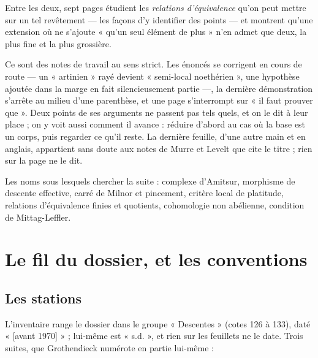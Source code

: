 \documentclass[11pt,a4paper]{article}
\begin{document}
\begin{resume}
Entre les deux, sept pages étudient les \emph{relations d'équivalence} qu'on
peut mettre sur un tel revêtement — les façons d'y identifier des points — et
montrent qu'une extension où ne s'ajoute « qu'un seul élément de plus »
n'en admet que deux, la plus fine et la plus grossière.

Ce sont des notes de travail au sens strict. Les énoncés se corrigent en
cours de route — un « artinien » rayé devient « semi-local noethérien », une
hypothèse ajoutée dans la marge en fait silencieusement partie —, la dernière
démonstration s'arrête au milieu d'une parenthèse, et une page s'interrompt
sur « il faut prouver que ». Deux points de ses arguments ne passent pas tels
quels, et on le dit à leur place ; on y voit aussi comment il avance : réduire
d'abord au cas où la base est un corps, puis regarder ce qu'il reste. La
dernière feuille, d'une autre main et en anglais, appartient sans doute aux
notes de Murre et Levelt que cite le titre ; rien sur la page ne le dit.

Les noms sous lesquels chercher la suite : complexe d'Amitsur, morphisme de
descente effective, carré de Milnor et pincement, critère local de
platitude, relations d'équivalence finies et quotients, cohomologie non
abélienne, condition de Mittag-Leffler.

\end{resume}

\section*{Le fil du dossier, et les conventions}

\subsection*{Les stations}

L'inventaire range le dossier dans le groupe « Descentes » (cotes 126 à 133),
daté « [avant 1970] » ; lui-même est « s.d. », et rien sur les feuillets ne le
date. Trois suites, que Grothendieck numérote en partie lui-même :
\end{document}
